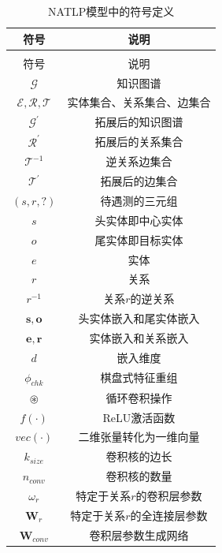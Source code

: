 \renewcommand\arraystretch{1.2}
\begin{longtable}[htbp]{cc}
  \caption{NATLP模型中的符号定义}
  \label{definition}\\
  \toprule
  符号  & 说明\\
  \midrule
  \endfirsthead
  \caption{NATLP模型中的符号定义}\\
  \toprule
  符号  & 说明 \\
  \midrule
  \endhead
  \hline
  \endfoot
  \bottomrule
  \endlastfoot
  
  $\mathcal{G}$   &   知识图谱      \\
  $\mathcal{E}, \mathcal{R}, \mathcal{T}$   &   实体集合、关系集合、边集合      \\
  $\mathcal{G}^\prime$  &  拓展后的知识图谱      \\
  $\mathcal{R}^{\prime}$   &   拓展后的关系集合      \\
  $\mathcal{T}^{-1}$   &   逆关系边集合      \\
  $\mathcal{T}^{\prime}$   &   拓展后的边集合      \\
  $(s,r,?)$  &   待遇测的三元组      \\
  $s$   &   头实体即中心实体      \\
  $o$   &   尾实体即目标实体      \\
  $e$   &   实体      \\
  $r$   &   关系      \\
  $r^{-1}$   &   关系$r$的逆关系      \\
  $\boldsymbol{s},\boldsymbol{o}$ & 头实体嵌入和尾实体嵌入\\
  $\boldsymbol{e},\boldsymbol{r}$ & 实体嵌入和关系嵌入\\
  $d$ &嵌入维度\\
  $\phi_{chk}$ & 棋盘式特征重组\\
  $\circledast$ & 循环卷积操作\\
  $f(\cdot )$ & ReLU激活函数\\
  $vec(\cdot)$ & 二维张量转化为一维向量\\
  $k_{size}$ &卷积核的边长\\
  $n_{conv}$ &卷积核的数量\\
  $\omega_r$ & 特定于关系$r$的卷积层参数\\
  $\mathbf{W}_r$ &特定于关系$r$的全连接层参数\\
  $\mathbf{W}_{conv}$ & 卷积层参数生成网络\\

\end{longtable}
